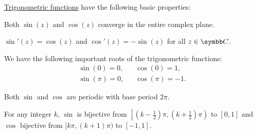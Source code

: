 \begin{proposition}\label{thm:trigonometric_function_properties}
  \hyperref[def:trigonometric_functions]{Trigonometric functions} have the following basic properties:
  \begin{propenum}
     Both \( \sin(z) \) and \( \cos(z) \) converge in the entire complex plane.

     \( \sin'(z) = \cos(z) \) and \( \cos'(z) = -\sin(z) \) for all \( z \in \BC \).

     We have the following important roots of the trigonometric functions:
    \begin{align}
      \sin(0) = 0,   && \cos(0) = 1,    \label{thm:trigonometric_function_properties/zeros/zero} \\
      \sin(\pi) = 0, && \cos(\pi) = -1. \label{thm:trigonometric_function_properties/zeros/pi}
    \end{align}

     Both \( \sin \) and \( \cos \) are periodic with base period \( 2\pi \).

     For any integer \( k \), \( \sin \) is bijective from \( \left[(k - \tfrac 1 2) \pi, (k + \tfrac 1 2) \pi \right) \) to \( [0, 1] \) and \( \cos \) bijective from \( [k\pi, (k + 1)\pi) \) to \( [-1, 1] \).
  \end{propenum}
\end{proposition}
